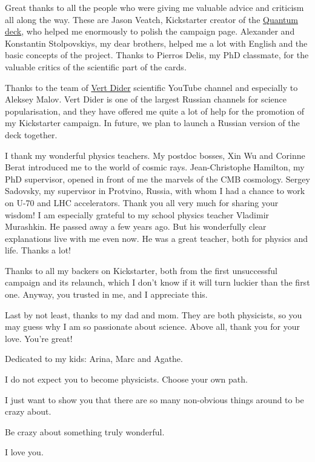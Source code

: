 \documentclass[]{bookest}
\begin{document}
Great thanks to all the people who were giving me valuable advice and criticism all along the way. These are Jason Veatch, Kickstarter creator of the \href{https://www.kickstarter.com/projects/qedplayingcards/quantum-playing-cards}{Quantum deck}, who helped me enormously to polish the campaign page. Alexander and Konstantin Stolpovskiys, my dear brothers, helped me a lot with English and the basic concepts of the project. Thanks to Pierros Delis, my PhD classmate, for the valuable critics of the scientific part of the cards.

Thanks to the team of \href{https://www.youtube.com/c/VertDiderScience}{Vert Dider} scientific YouTube channel and especially to Aleksey Malov. Vert Dider is one of the largest Russian channels for science popularisation, and they have offered me quite a lot of help for the promotion of my Kickstarter campaign. In future, we plan to launch a Russian version of the deck together.

I thank my wonderful physics teachers. My postdoc bosses, Xin Wu and Corinne Berat introduced me to the world of cosmic rays. Jean-Christophe Hamilton, my PhD supervisor, opened in front of me the marvels of the CMB cosmology. Sergey Sadovsky, my supervisor in Protvino, Russia, with whom I had a chance to work on U-70 and LHC accelerators. Thank you all very much for sharing your wisdom! I am especially grateful to my school physics teacher Vladimir Murashkin. He passed away a few years ago. But his wonderfully clear explanations live with me even now. He was a great teacher, both for physics and life. Thanks a lot!

Thanks to all my backers on Kickstarter, both from the first unsuccessful campaign and its relaunch, which I don't know if it will turn luckier than the first one. Anyway, you trusted in me, and I appreciate this.

Last by not least, thanks to my dad and mom. They are both physicists, so you may guess why I am so passionate about science. Above all, thank you for your love. You're great!


\newpage

\null
\vskip100pt



\begin{dedication}

Dedicated to my kids: Arina, Marc and Agathe. 

I do not expect you to become physicists. Choose your own path.

I just want to show you that there are so many non-obvious things around to be crazy about. 

Be crazy about something truly wonderful. 

I love you.
\end{dedication}

\newpage





\end{document}
